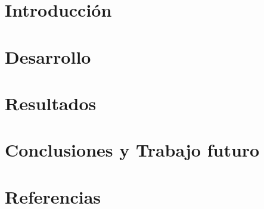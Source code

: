 \documentclass[11pt, a4paper]{article}
\begin{document}

\maketitle
\newpage

\tableofcontents
\newpage

%
\section{Introducción}


\section{Desarrollo}


\section{Resultados}


\section{Conclusiones y Trabajo futuro}


\section{Referencias}



%
% 
%
\end{document}
